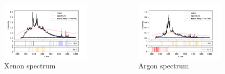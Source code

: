 \documentclass{beamer}
\begin{document}
\begin{frame}
\begin{itemize}
\begin{columns}
				\begin{figure}
					\centering
					\includegraphics[width=\linewidth]{gen/xe_lines.pdf}
					\caption*{Xenon spectrum}
				\end{figure}

				\begin{figure}
					\centering
					\includegraphics[width=\linewidth]{gen/ar_lines.pdf}
					\caption*{Argon spectrum}
				\end{figure}
				
			\end{columns}
			
		\end{itemize}
				
	\end{frame}
	
\end{document}
